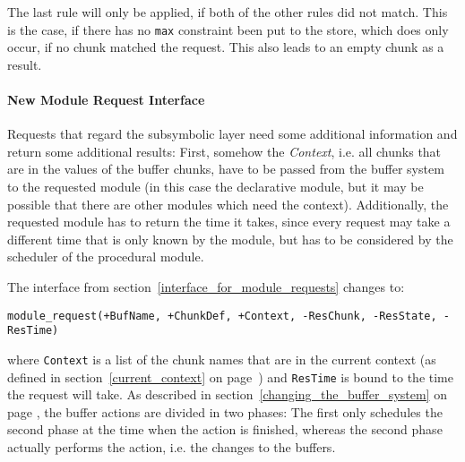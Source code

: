 The last rule will only be applied, if both of the other rules did not match. This is the case, if there has no \lstinline|max| constraint been put to the store, which does only occur, if no chunk matched the request. This also leads to an empty chunk as a result.

\paragraph{New Module Request Interface}

Requests that regard the subsymbolic layer need some additional information and return some additional results: First, somehow the \emph{Context}, i.e. all chunks that are in the values of the buffer chunks, have to be passed from the buffer system to the requested module (in this case the declarative module, but it may be possible that there are other modules which need the context). Additionally, the requested module has to return the time it takes, since every request may take a different time that is only known by the module, but has to be considered by the scheduler of the procedural module.

The interface from section~\ref{interface_for_module_requests} changes to:

\begin{lstlisting}[label=lst:imodule_final, caption={The final version of the interface \emph{IModule}}]
module_request(+BufName, +ChunkDef, +Context, -ResChunk, -ResState, -ResTime) 
\end{lstlisting}

where \lstinline|Context| is a list of the chunk names that are in the current context (as defined in section~\ref{current_context} on page~\pageref{current_context}) and \lstinline|ResTime| is bound to the time the request will take. As described in section~\ref{changing_the_buffer_system} on page \pageref{changing_the_buffer_system}, the buffer actions are divided in two phases: The first only schedules the second phase at the time when the action is finished, whereas the second phase actually performs the action, i.e. the changes to the buffers.

